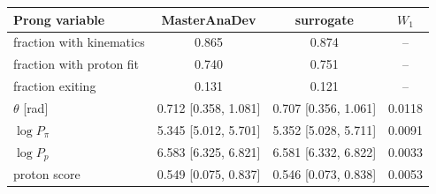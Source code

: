 \begin{tabular}{lccc}
\toprule
Prong variable & MasterAnaDev & surrogate & $W_1$ \\
\midrule
fraction with kinematics & 0.865 & 0.874 & -- \\
fraction with proton fit & 0.740 & 0.751 & -- \\
fraction exiting & 0.131 & 0.121 & -- \\
$\theta$ [rad] & 0.712 [0.358, 1.081] & 0.707 [0.356, 1.061] & 0.0118 \\
$\log P_\pi$ & 5.345 [5.012, 5.701] & 5.352 [5.028, 5.711] & 0.0091 \\
$\log P_p$ & 6.583 [6.325, 6.821] & 6.581 [6.332, 6.822] & 0.0033 \\
proton score & 0.549 [0.075, 0.837] & 0.546 [0.073, 0.838] & 0.0053 \\
\bottomrule
\end{tabular}
